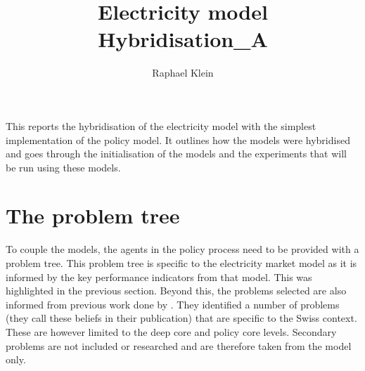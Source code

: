 \documentclass[12pt]{article}
\title{Electricity model\\ Hybridisation\_A}
\author{Raphael Klein}
\begin{document}
\maketitle






This reports the hybridisation of the electricity model with the simplest implementation of the policy model. It outlines how the models were hybridised and goes through the initialisation of the models and the experiments that will be run using these models.

\tableofcontents

\section{The problem tree}
\label{sec:interfaceProblemTree}


To couple the models, the agents in the policy process need to be provided with a problem tree. This problem tree is specific to the electricity market model as it is informed by the key performance indicators from that model. This was highlighted in the previous section. Beyond this, the problems selected are also informed from previous work done by \cite{markard2016socio}. They identified a number of problems (they call these beliefs in their publication) that are specific to the Swiss context. These are however limited to the deep core and policy core levels. Secondary problems are not included or researched and are therefore taken from the model only.
\end{document}
